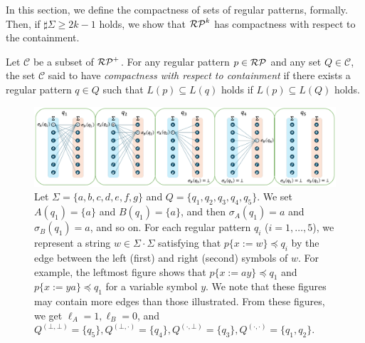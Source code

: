 
In this section, we define the compactness of sets of regular patterns, formally.
Then, if $\sharp\Sigma \ge 2k-1$ holds, 
we show that 
$\mathcal{RP}^{k}$ has compactness with respect to the containment.

\begin{dfn}\label{def:compactness}
Let $\mathcal{C}$ be a subset of $\mathcal{RP}^{+}$. 
For any regular pattern $p \in \mathcal{RP}$ and any set $Q \in \mathcal{C}$,
the set $\mathcal{C}$ said to have {\it compactness with respect to containment}
if there exists a regular pattern $q \in Q$ such that $L(p) \subseteq L(q)$ holds if $L(p) \subseteq L(Q)$ holds.
\end{dfn}


\begin{figure}[t]
  \begin{center}
    \includegraphics[scale=0.54]{figs/lem8eachreg.pdf}
    \caption{Let $\Sigma=\{a,b,c,d,e,f,g\}$ {\color{red} and } $Q=\{q_1,q_2,q_3,q_4,q_5\}$. 
    We set $A(q_1)=\{a\}$ and $B(q_1)=\{a\}$, and then $\sigma_A(q_1)=a$ and $\sigma_B(q_1)=a$, and so on. For each regular pattern $q_i$ ($i=1,\ldots,5$), we represent a string $w \in \Sigma\cdot\Sigma$ satisfying that $p\{x:=w\}\preceq q_i$ by the edge between the left (first) and right (second) symbols of $w$. For example, the leftmost figure shows that $p\{x:=ay\}\preceq q_1$ and $p\{x:=ya\}\preceq q_1$ for a variable symbol $y$. We note that these figures may contain more edges than those illustrated. From these figures, we get $\ell_A=1, \ell_B=0$, and $Q^{(\bot,\bot)}=\{q_5\}, Q^{(\bot,\cdot)}=\{q_4\}, Q^{(\cdot,\bot)}=\{q_3\}, Q^{(\cdot,\cdot)}=\{q_1,q_2\}$.}\label{fig:lem8eachreg}
  \end{center}
\end{figure}

